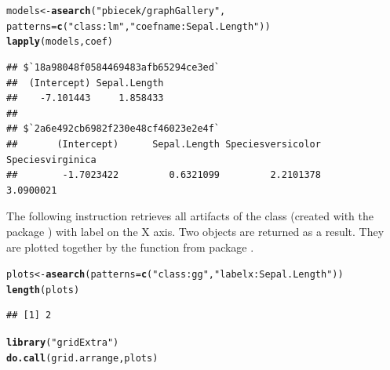 \documentclass[nojss]{jss}\usepackage[]{graphicx}\usepackage[]{color}
\makeatletter
\newcommand{\hlstr}[1]{\textcolor[rgb]{0.192,0.494,0.8}{#1}}%
\newcommand{\hlstd}[1]{\textcolor[rgb]{0.345,0.345,0.345}{#1}}%
\newcommand{\hlkwb}[1]{\textcolor[rgb]{0.69,0.353,0.396}{#1}}%
\newcommand{\hlkwc}[1]{\textcolor[rgb]{0.333,0.667,0.333}{#1}}%
\newcommand{\hlkwd}[1]{\textcolor[rgb]{0.737,0.353,0.396}{\textbf{#1}}}%
\newenvironment{kframe}{%
 \def\at@end@of@kframe{}%
 \ifinner\ifhmode%
  \def\at@end@of@kframe{\end{minipage}}%
  \begin{minipage}{\columnwidth}%
 \fi\fi%
 \def\FrameCommand##1{\hskip\@totalleftmargin \hskip-\fboxsep
 \colorbox{shadecolor}{##1}\hskip-\fboxsep
     \hskip-\linewidth \hskip-\@totalleftmargin \hskip\columnwidth}%
 \MakeFramed {\advance\hsize-\width
   \@totalleftmargin\z@ \linewidth\hsize
   \@setminipage}}%
 {\par\unskip\endMakeFramed%
 \at@end@of@kframe}
\newenvironment{knitrout}{}{} %
\makeatother
\begin{document}
\begin{knitrout}
\color{fgcolor}\begin{kframe}
\begin{alltt}
\hlstd{models} \hlkwb{<-} \hlkwd{asearch}\hlstd{(}\hlstr{"pbiecek/graphGallery"}\hlstd{,}
    \hlkwc{patterns} \hlstd{=} \hlkwd{c}\hlstd{(}\hlstr{"class:lm"}\hlstd{,} \hlstr{"coefname:Sepal.Length"}\hlstd{))}
\hlkwd{lapply}\hlstd{(models, coef)}
\end{alltt}
\begin{verbatim}
## $`18a98048f0584469483afb65294ce3ed`
##  (Intercept) Sepal.Length 
##    -7.101443     1.858433 
## 
## $`2a6e492cb6982f230e48cf46023e2e4f`
##       (Intercept)      Sepal.Length Speciesversicolor  Speciesvirginica 
##        -1.7023422         0.6321099         2.2101378         3.0900021
\end{verbatim}
\end{kframe}
\end{knitrout}

The following instruction retrieves all artifacts of the  class (created with the package ) with label  on the X axis. Two objects are returned as a result. They are plotted together by the  function from  package \citep[see][]{gridExtra}.

\begin{knitrout}
\color{fgcolor}\begin{kframe}
\begin{alltt}
\hlstd{plots} \hlkwb{<-} \hlkwd{asearch}\hlstd{(}\hlkwc{patterns} \hlstd{=} \hlkwd{c}\hlstd{(}\hlstr{"class:gg"}\hlstd{,} \hlstr{"labelx:Sepal.Length"}\hlstd{))}
\hlkwd{length}\hlstd{(plots)}
\end{alltt}
\begin{verbatim}
## [1] 2
\end{verbatim}
\end{kframe}
\end{knitrout}

\begin{knitrout}
\color{fgcolor}\begin{kframe}
\begin{alltt}
\hlkwd{library}\hlstd{(}\hlstr{"gridExtra"}\hlstd{)}
\hlkwd{do.call}\hlstd{(grid.arrange, plots)}
\end{alltt}
\end{kframe}
\end{knitrout}
\end{document}
